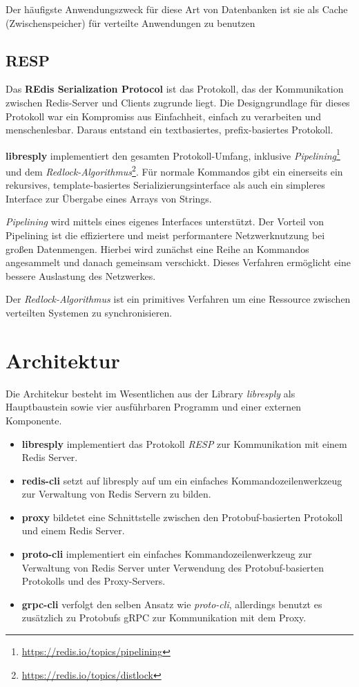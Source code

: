 \documentclass[a4paper,ngerman]{article}
\begin{document}
Der häufigste Anwendungszweck für diese Art von Datenbanken ist sie als Cache (Zwischenspeicher) für verteilte Anwendungen zu benutzen

\subsection{RESP}
Das \textbf{REdis Serialization Protocol} ist das Protokoll, das der Kommunikation zwischen Redis-Server und Clients zugrunde liegt. Die Designgrundlage für dieses Protokoll war ein Kompromiss aus Einfachheit, einfach zu verarbeiten und menschenlesbar.
Daraus entstand ein textbasiertes, prefix-basiertes Protokoll.

\textbf{libresply} implementiert den gesamten Protokoll-Umfang, inklusive \textit{Pipelining}\footnote{\url{https://redis.io/topics/pipelining}} und dem \textit{Redlock-Algorithmus}\footnote{\url{https://redis.io/topics/distlock}}.
Für normale Kommandos gibt ein einerseits ein rekursives, template-basiertes Serializierungsinterface als auch ein simpleres Interface zur Übergabe eines Arrays von Strings.

\textit{Pipelining} wird mittels eines eigenes Interfaces unterstützt. Der Vorteil von Pipelining ist die effiziertere und meist performantere Netzwerknutzung bei großen Datenmengen. Hierbei wird zunächst eine Reihe an Kommandos angesammelt und danach gemeinsam verschickt. Dieses Verfahren ermöglicht eine bessere Auslastung des Netzwerkes.

Der \textit{Redlock-Algorithmus} ist ein primitives Verfahren um eine Ressource zwischen verteilten Systemen zu synchronisieren.


\section{Architektur}
Die Architekur besteht im Wesentlichen aus der Library \textit{libresply} als Hauptbaustein sowie vier ausführbaren Programm und einer externen Komponente.

\begin{itemize}
        \item{\textbf{libresply}} implementiert das Protokoll \textit{RESP} zur Kommunikation mit einem Redis Server.
        \item{\textbf{redis-cli}} setzt auf libresply auf um ein einfaches Kommandozeilenwerkzeug zur Verwaltung von Redis Servern zu bilden.
        \item{\textbf{proxy}} bildetet eine Schnittstelle zwischen den Protobuf-basierten Protokoll und einem Redis Server.
        \item{\textbf{proto-cli}} implementiert ein einfaches Kommandozeilenwerkzeug zur Verwaltung von Redis Server unter Verwendung des Protobuf-basierten Protokolls und des Proxy-Servers.
        \item{\textbf{grpc-cli}} verfolgt den selben Ansatz wie \textit{proto-cli}, allerdings benutzt es zusätzlich zu Protobufs gRPC zur Kommunikation mit dem Proxy.
\end{itemize}
\end{document}

